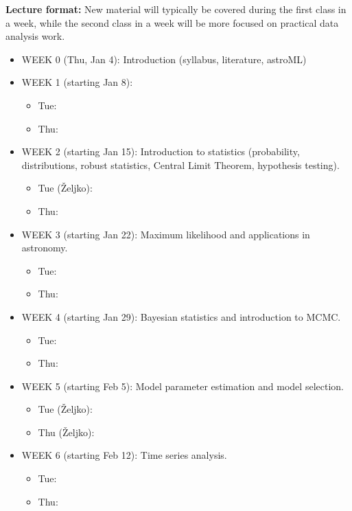 \documentclass[10pt]{article}
\begin{document}
{\bf Lecture format:}
New material will typically be covered during the first class in a week, while
the second class in a week will be more focused on practical data analysis work. 

\newpage 
\begin{itemize}

\item WEEK 0 (Thu, Jan 4): Introduction (syllabus, literature, astroML) 

\item WEEK 1 (starting Jan 8): 
\begin{itemize}
\item Tue: 
\item Thu: 
\end{itemize}     
\item WEEK  2 (starting Jan 15): Introduction to statistics (probability, distributions, 
                 robust statistics, Central Limit Theorem,  hypothesis testing).
\begin{itemize}
\item Tue (\v{Zeljko}): 
\item Thu: 
\end{itemize}     

\item WEEK  3 (starting Jan 22):  Maximum likelihood and applications in astronomy.
\begin{itemize}
\item Tue: 
\item Thu: 
\end{itemize}     

\item WEEK  4 (starting Jan 29):  Bayesian statistics and introduction to MCMC.
\begin{itemize}
\item Tue: 
\item Thu: 
\end{itemize}     

\item WEEK  5 (starting Feb 5):  Model parameter estimation and model selection.
\begin{itemize}
\item Tue (\v{Zeljko}): 
\item Thu (\v{Zeljko}): 
\end{itemize}     

\item WEEK  6 (starting Feb 12):   Time series analysis.
\begin{itemize}
\item Tue: 
\item Thu: 
\end{itemize}     


\end{itemize}
\end{document}

